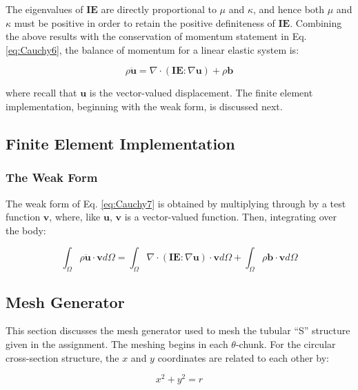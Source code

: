 \documentclass[10pt]{article}
\begin{document}
The eigenvalues of \(\textbf{IE}\) are directly proportional to \(\mu\) and \(\kappa\), and hence both \(\mu\) and \(\kappa\) must be positive in order to retain the positive definiteness of \(\textbf{IE}\). Combining the above results with the conservation of momentum statement in Eq. \eqref{eq:Cauchy6}, the balance of momentum for a linear elastic system is:

\begin{equation}
\label{eq:Cauchy7}
\rho\ddot{\textbf{u}}=\nabla\cdot(\textbf{IE}:\nabla \textbf{u})+\rho\textbf{b}
\end{equation}

where recall that \(\textbf{u}\) is the vector-valued displacement. The finite element implementation, beginning with the weak form, is discussed next.

\subsection{Finite Element Implementation}

\subsubsection{The Weak Form}

The weak form of Eq. \eqref{eq:Cauchy7} is obtained by multiplying through by a test function \(\textbf{v}\), where, like \(\textbf{u}\), \(\textbf{v}\) is a vector-valued function. Then, integrating over the body:

\begin{equation}
\int_{\Omega}\rho\ddot{\textbf{u}}\cdot \textbf{v}d\Omega=\int_{\Omega}\nabla\cdot(\textbf{IE}:\nabla \textbf{u})\cdot\textbf{v}d\Omega+\int_{\Omega}\rho\textbf{b}\cdot\textbf{v}d\Omega
\end{equation}


\subsection{Mesh Generator}

This section discusses the mesh generator used to mesh the tubular ``S'' structure given in the assignment. The meshing begins in each \(\theta\)-chunk. For the circular cross-section structure, the \(x\) and \(y\) coordinates are related to each other by:

\begin{equation}
\label{eq:xy}
x^2+y^2=r
\end{equation}
\end{document}
